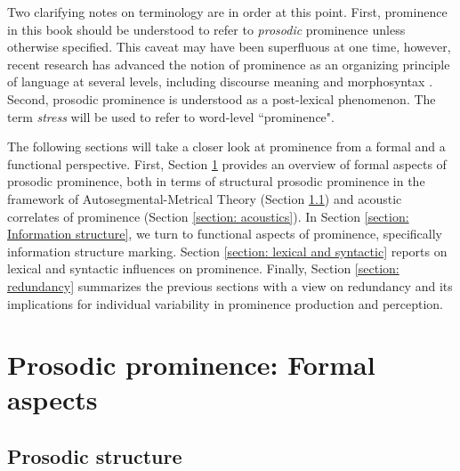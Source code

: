 Two clarifying notes on terminology are in order at this point. First, prominence in this book should be understood to refer to \textit{prosodic} prominence unless otherwise specified. This caveat may have been superfluous at one time, however, recent research has advanced the notion of prominence as an organizing principle of language at several levels, including discourse meaning and morphosyntax \citep{himmelmannProminenceProsodyFirst2015, vonheusingerDiscourseProminenceDefinition2019}. Second, prosodic prominence is understood as a post-lexical phenomenon. The term \textit{stress} will be used to refer to word-level ``prominence". 

The following sections will take a closer look at prominence from a formal and a functional perspective. First, Section \ref{section: prominence form} provides an overview of formal aspects of prosodic prominence, both in terms of structural prosodic prominence in the framework of Autosegmental-Metrical Theory (Section \ref{section: structural prominence}) and acoustic correlates of prominence (Section \ref{section: acoustics}). In Section \ref{section: Information structure}, we turn to functional aspects of prominence, specifically information structure marking. Section \ref{section: lexical and syntactic} reports on lexical and syntactic influences on prominence. Finally, Section \ref{section: redundancy} summarizes the previous sections with a view on redundancy and its implications for individual variability in prominence production and perception.

\section{Prosodic prominence: Formal aspects} \label{section: prominence form}

\subsection{Prosodic structure} \label{section: structural prominence}

